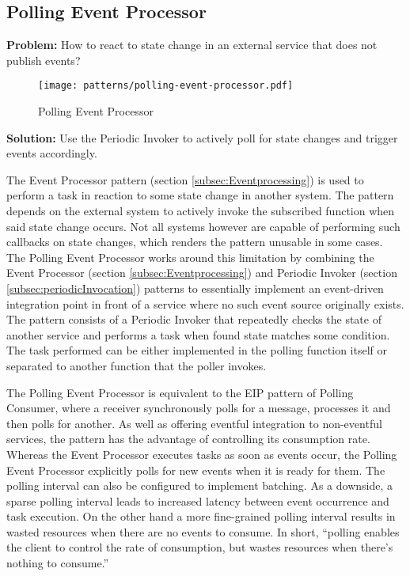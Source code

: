 \subsection{Polling Event Processor} \label{subsec:PollingEventProcessor}

\textbf{Problem:} How to react to state change in an external service that does not publish events?

\begin{figure}[h]
  \centering
  \texttt{[image: patterns/polling-event-processor.pdf]}
  \caption{Polling Event Processor}
  \label{fig:PollingEventProcessor}
\end{figure}

\textbf{Solution:} Use the Periodic Invoker to actively poll for state changes and trigger events accordingly.

The Event Processor pattern (section \ref{subsec:Eventprocessing}) is used to perform a task in reaction to some state change in another system. The pattern depends on the external system to actively invoke the subscribed function when said state change occurs. Not all systems however are capable of performing such callbacks on state changes, which renders the pattern unusable in some cases. The Polling Event Processor works around this limitation by combining the Event Processor (section \ref{subsec:Eventprocessing}) and Periodic Invoker (section \ref{subsec:periodicInvocation}) patterns to essentially implement an event-driven integration point in front of a service where no such event source originally exists. The pattern consists of a Periodic Invoker that repeatedly checks the state of another service and performs a task when found state matches some condition. The task performed can be either implemented in the polling function itself or separated to another function that the poller invokes.

The Polling Event Processor is equivalent to the EIP pattern of Polling Consumer, where a receiver synchronously polls for a message, processes it and then polls for another. As well as offering eventful integration to non-eventful services, the pattern has the advantage of controlling its consumption rate. Whereas the Event Processor executes tasks as soon as events occur, the Polling Event Processor explicitly polls for new events when it is ready for them. The polling interval can also be configured to implement batching. As a downside, a sparse polling interval leads to increased latency between event occurrence and task execution. On the other hand a more fine-grained polling interval results in wasted resources when there are no events to consume. In short, ``polling enables the client to control the rate of consumption, but wastes resources when there’s nothing to consume.'' \parencite{hohpe2004enterprise}

